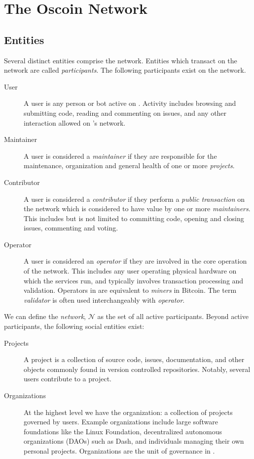 \section{The Oscoin Network}

\subsection{Entities}

\noindent Several distinct entities comprise the network.  Entities which
transact on the network are called \emph{participants}. The following
participants exist on the \oscoin{} network.

\addvspace{1em}

\begin{description}
    \item[User] A user is any person or bot active on \oscoin{}.  Activity
        includes browsing and submitting code, reading and commenting on
        issues, and any other interaction allowed on \oscoin{}'s network.
    \item[Maintainer] A user is considered a \emph{maintainer} if they
        are responsible for the maintenance, organization and general health of
        one or more \emph{projects}.
    \item[Contributor] A user is considered a \emph{contributor} if they
        perform a \emph{public transaction} on the network which is considered
        to have value by one or more \emph{maintainers}. This includes but is
        not limited to committing code, opening and closing issues, commenting
        and voting.
    \item[Operator] A user is considered an \emph{operator} if they are involved
        in the core operation of the network. This includes any user operating
        physical hardware on which the \oscoin{} services run, and typically
        involves transaction processing and validation. Operators in \oscoin{}
        are equivalent to \emph{miners} in Bitcoin. The term \emph{validator}
        is often used interchangeably with \emph{operator}.
\end{description}

\addvspace{1em}
\noindent We can define the \emph{network}, $\mathcal{N}$ as the set of all active
participants. Beyond active participants, the following social entities
exist:

\begin{description}
    \item[Projects] A project is a collection of source code, issues,
        documentation, and other objects commonly found in version
        controlled repositories. Notably, several users contribute to a
        project.
    \item[Organizations] At the highest level we have the organization: a
        collection of projects governed by users. Example organizations
        include large software foundations like the Linux Foundation,
        decentralized autonomous organizations (DAOs) such as Dash, and
        individuals managing their own personal projects. Organizations are
        the unit of governance in \oscoin{}.
\end{description}
\addvspace{1em}

